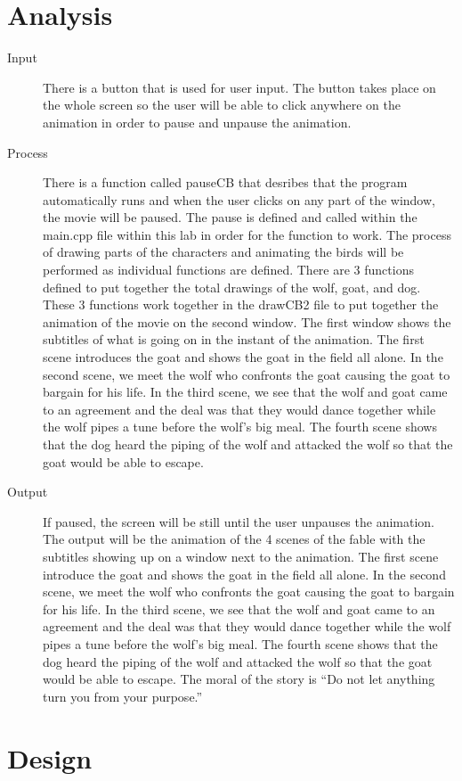 \documentclass{article}
\begin{document}
\newpage\section{Analysis}
\begin{description}
	\item [Input] There is a button that is used for user input. The button takes 
	place on the whole screen so the user will be able to click anywhere on the
	animation in order to pause and unpause the animation.
	\item [Process] There is a function called pauseCB that desribes that the 
	program automatically runs and when the user clicks on any part of the window,
	the movie will be paused. The pause is defined and called within the main.cpp 
	file within this lab in order for the function to work. The process of drawing
         parts of the characters and animating the birds will be 
         performed as individual functions are defined. There are 3 functions 
         defined to put together the total drawings of the wolf, goat, and dog. These
         3 functions work together in the drawCB2 file to put together the animation 
         of the movie on the second window. The first window shows the subtitles
         of what is going on in the instant of the animation. The first scene introduces
         the goat and shows the goat in the field all alone. In the second scene, we meet 
         the wolf who confronts the goat causing the goat to bargain for his life. In the 
         third scene, we see that the wolf and goat came to an agreement and the deal was
         that they would dance together while the wolf pipes a tune before the wolf's big 
         meal. The fourth scene shows that the dog heard the piping of the wolf and
         attacked the wolf so that the goat would be able to escape.
	\item [Output] If paused, the screen will be still until the user unpauses the animation.
	The output will be the animation of the 4 scenes of the fable
        with the subtitles showing up on a window next to the animation. The first scene 
         introduce the goat and shows the goat in the field all alone. In the second scene, we meet 
         the wolf who confronts the goat causing the goat to bargain for his life. In the 
         third scene, we see that the wolf and goat came to an agreement and the deal was
         that they would dance together while the wolf pipes a tune before the wolf's big 
         meal. The fourth scene shows that the dog heard the piping of the wolf and
         attacked the wolf so that the goat would be able to escape. The moral of the 
         story is “Do not let anything turn you from your purpose.”
	
\end{description}
\newpage\section{Design}
\end{document}
